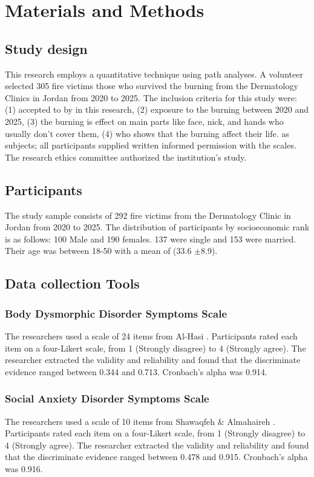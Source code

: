 \documentclass[10pt]{NSP1}
\begin{document}
	\section{Materials and Methods}
	
	\subsection{Study design}
	This research employs a quantitative technique using path analyses. A volunteer selected 305 fire victims those who survived the burning from the Dermatology Clinics in Jordan from 2020 to 2025. The inclusion criteria for this study were: (1) accepted to by in this research, (2) exposure to the burning between 2020 and 2025, (3) the burning is effect on main parts like face, nick, and hands who usually don't cover them, (4) who shows that the burning affect their life. as subjects; all participants supplied written informed permission with the scales. The research ethics committee authorized the institution's study.
	
	\subsection{Participants}
	The study sample consists of 292 fire victims from the Dermatology Clinic in Jordan from 2020 to 2025. The distribution of participants by socioeconomic rank is as follows: 100 Male and 190 females. 137 were single and 153 were married. Their age was between 18-50 with a mean of (33.6 $\pm$8.9).
	
	\subsection{Data collection Tools}
	
	\subsubsection{Body Dysmorphic Disorder Symptoms Scale}
	The researchers used a scale of 24 items from Al-Hasi \cite{AlHasi2023}. Participants rated each item on a four-Likert scale, from 1 (Strongly disagree) to 4 (Strongly agree). The researcher extracted the validity and reliability and found that the discriminate evidence ranged between 0.344 and 0.713. Cronbach's alpha was 0.914.
	
	\subsubsection{Social Anxiety Disorder Symptoms Scale}
	The researchers used a scale of 10 items from Shawaqfeh \& Almahaireh \cite{Shawaqfeh2022}. Participants rated each item on a four-Likert scale, from 1 (Strongly disagree) to 4 (Strongly agree). The researcher extracted the validity and reliability and found that the discriminate evidence ranged between 0.478 and 0.915. Cronbach's alpha was 0.916.
	
\end{document}
